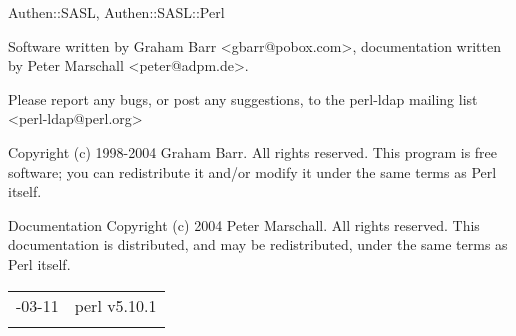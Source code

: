 \documentclass[]{article}
\begin{document}
Authen::SASL, Authen::SASL::Perl


Software written by Graham Barr
\textless{}gbarr@pobox.com\textgreater{}, documentation written by Peter
Marschall \textless{}peter@adpm.de\textgreater{}.

Please report any bugs, or post any suggestions, to the perl-ldap
mailing list \textless{}perl-ldap@perl.org\textgreater{}


Copyright (c) 1998-2004 Graham Barr. All rights reserved. This program
is free software; you can redistribute it and/or modify it under the
same terms as Perl itself.

Documentation Copyright (c) 2004 Peter Marschall. All rights reserved.
This documentation is distributed, and may be redistributed, under the
same terms as Perl itself.

\begin{longtable}[c]{@{}ll@{}}
\toprule\addlinespace
2010-03-11 & perl v5.10.1
\\\addlinespace
\bottomrule
\end{longtable}
\end{document}
